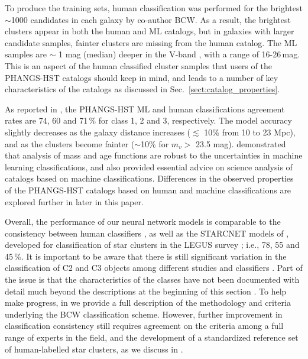 \documentclass[]{aastex631}
\begin{document}
To produce the training sets, human classification was performed for the brightest $\sim$1000 candidates in each galaxy by co-author BCW. As a result, the brightest clusters appear in both the human and ML catalogs, but in galaxies with larger candidate samples, fainter clusters are missing from the human catalog.  The ML samples are $\sim$ 1 mag (median) deeper in the V-band \citep[and Section~\ref{ssect:v_mag}]{whitmore_star_2021}, with a range of 16-26\,mag. 
This is an aspect of the human classified cluster samples that users of the PHANGS-HST catalogs should keep in mind, and leads to a number of key characteristics of the catalogs as discussed in Sec.~\ref{sect:catalog_properties}.   

As reported in \citet{hannon_star_2023}, the PHANGS-HST ML and human classifications agreement rates are 74, 60 and 71\,\% for class 1, 2 and 3, respectively.  
The model accuracy slightly decreases as the galaxy distance increases ($\lesssim$ 10\% from 10 to 23 Mpc), and as the clusters become fainter ($\sim$10\% for $m_v>$ 23.5 mag). \citet{whitmore_star_2021} demonstrated that analysis of mass and age functions are robust to the uncertainties in machine learning classifications, and also provided essential advice on science analysis of catalogs based on machine classifications.  Differences in the observed properties of the PHANGS-HST catalogs based on human and machine classifications are explored further in later in this paper.

Overall, the performance of our neural network models is comparable to the consistency between human classifiers \citep{wei_deep_2020, whitmore_star_2021}, as well as the \textsc{STARCNET} models of \citet{perez_starcnet_2021}, developed for classification of star clusters in the LEGUS survey \citep{calzetti_legacy_2015, linden_star_2022}; i.e., 78, 55 and 45\,\%.  It is important to be aware that there is still significant variation in the classification of C2 and C3 objects among different studies and classifiers \citep[e.g., discussion in section 6.3.3 of][]{whitmore_star_2021}.  Part of the issue is that the characteristics of the classes have not been documented with detail much beyond the descriptions at the beginning of this section \citep[e.g., see section 2 in both][]{adamo_legacy_2017, perez_starcnet_2021}.  To help make progress, in \citet{whitmore_star_2021} we provide a full description of the methodology and criteria underlying the BCW classification scheme.  However, further improvement in classification consistency still requires agreement on the criteria among a full range of experts in the field, and the development of a standardized reference set of human-labelled star clusters, as we discuss in \citet{wei_deep_2020}.  
\end{document}

